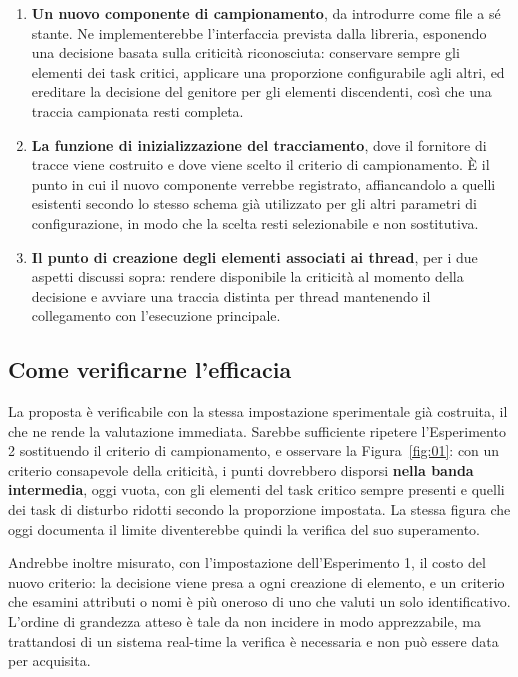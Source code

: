 \begin{enumerate}
\item \textbf{Un nuovo componente di campionamento}, da introdurre come file a s\'e stante. Ne
implementerebbe l'interfaccia prevista dalla libreria, esponendo una decisione basata sulla
criticit\`a riconosciuta: conservare sempre gli elementi dei task critici, applicare una
proporzione configurabile agli altri, ed ereditare la decisione del genitore per gli elementi
discendenti, cos\`i che una traccia campionata resti completa.

\item \textbf{La funzione di inizializzazione del tracciamento}, dove il fornitore di tracce viene
costruito e dove viene scelto il criterio di campionamento. \`E il punto in cui il nuovo componente
verrebbe registrato, affiancandolo a quelli esistenti secondo lo stesso schema gi\`a utilizzato per
gli altri parametri di configurazione, in modo che la scelta resti selezionabile e non sostitutiva.

\item \textbf{Il punto di creazione degli elementi associati ai thread}, per i due aspetti discussi
sopra: rendere disponibile la criticit\`a al momento della decisione e avviare una traccia distinta
per thread mantenendo il collegamento con l'esecuzione principale.
\end{enumerate}

\subsection{Come verificarne l'efficacia}

La proposta \`e verificabile con la stessa impostazione sperimentale gi\`a costruita, il che ne
rende la valutazione immediata. Sarebbe sufficiente ripetere l'Esperimento 2 sostituendo il criterio
di campionamento, e osservare la Figura~\ref{fig:01}: con un criterio consapevole della criticit\`a,
i punti dovrebbero disporsi \textbf{nella banda intermedia}, oggi vuota, con gli elementi del task
critico sempre presenti e quelli dei task di disturbo ridotti secondo la proporzione impostata.
La stessa figura che oggi documenta il limite diventerebbe quindi la verifica del suo superamento.

Andrebbe inoltre misurato, con l'impostazione dell'Esperimento 1, il costo del nuovo criterio: la
decisione viene presa a ogni creazione di elemento, e un criterio che esamini attributi o nomi \`e
pi\`u oneroso di uno che valuti un solo identificativo. L'ordine di grandezza atteso \`e tale da non
incidere in modo apprezzabile, ma trattandosi di un sistema real-time la verifica \`e necessaria e
non pu\`o essere data per acquisita.


